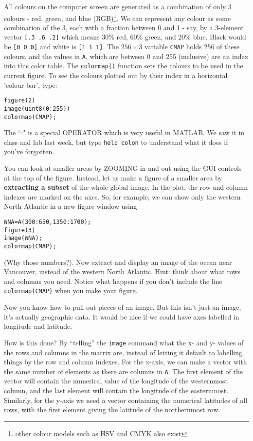 \documentclass[letterpaper,10pt]{article}
\begin{document}
All colours on the computer screen are generated as
a combination of only 3 colours - red, green, and blue (RGB)\footnote{other colour models such as HSV and CMYK also exist}. We can represent
any colour as some combination of the 3, each with a fraction between 0 and 1  - say, 
by a 3-element vector \verb+[.3 .6 .2]+
which means 30\% red, 60\% green, and 20\% blue. Black would be \verb+[0 0 0]+ and
white is \verb+[1 1 1]+. The $256\times 3$ variable \verb+CMAP+ holds 256 of these colours,
and the values in \verb+A+, which are between 0 and 255 (inclusive) are an index into this color
table. The \verb+colormap()+ function sets the colours to be used in the current figure.
To see the colours plotted out by their index in a horizontal 'colour bar', type:
\begin{verbatim}
figure(2)
image(uint8(0:255))
colormap(CMAP);
\end{verbatim}
The ``:" is a special OPERATOR which is very useful in MATLAB.  We saw it in class and lab last week, but type \verb+help colon+ to 
understand what it does if you've forgotten.
 
You can look at smaller areas by ZOOMING in and out using the GUI controls at the top of the
figure. Instead, let us make a figure of a smaller area by {\bf extracting a subset} of the whole global
image. In the plot, the row and column indexes are
marked on the axes. So, for example, we can show only the western North Atlantic in a new figure window using

\begin{verbatim}
WNA=A(300:650,1350:1700);
figure(3)
image(WNA);
colormap(CMAP);
\end{verbatim}

(Why those numbers?). Now extract and display an image of the ocean near Vancouver, instead of the western
North Atlantic. {Hint: think about what rows and columns you need}.   Notice what happens if you don't include the line \verb+colormap(CMAP)+ when you make your figure.

Now you know how to pull out pieces of an image. But this isn't just an image, it's actually
geographic data. It would be nice if
we could have axes labelled in longitude and latitude. 

How is this done? By ``telling'' the \verb+image+ command what the x- and y- values of
the rows and columns in the matrix are, instead of letting it default to labelling things by the row and column
indexes. For the x-axis, we can make a vector with the same
number of elements as there are columns in \verb+A+. The first element of the vector will contain 
the numerical value of the longitude of the westernmost column, and the last element will
contain the longitude of the easternmost. Similarly, for the y-axis we need a vector containing
the numerical latitudes of all rows, with the first element giving the latitude of the northernmost
row.
\end{document}
